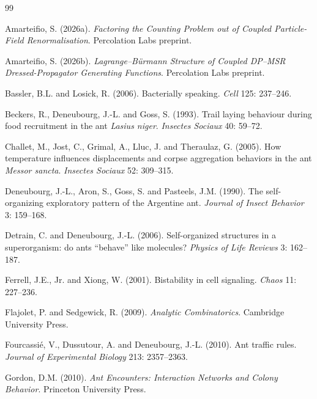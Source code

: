\documentclass[10pt,a4paper,twocolumn]{article}
\theoremstyle{definition}
\begin{document}
\begin{thebibliography}{99}

Amarteifio, S. (2026a).
\emph{Factoring the Counting Problem out of Coupled Particle-Field
Renormalisation}. Percolation Labs preprint.

Amarteifio, S. (2026b).
\emph{Lagrange--B\"urmann Structure of Coupled DP--MSR
Dressed-Propagator Generating Functions}. Percolation Labs preprint.

Bassler, B.L. and Losick, R. (2006). Bacterially speaking.
\emph{Cell} 125: 237--246.

Beckers, R., Deneubourg, J.-L. and Goss, S. (1993). Trail laying
behaviour during food recruitment in the ant \emph{Lasius niger}.
\emph{Insectes Sociaux} 40: 59--72.

Challet, M., Jost, C., Grimal, A., Lluc, J. and Theraulaz, G.
(2005). How temperature influences displacements and corpse
aggregation behaviors in the ant \emph{Messor sancta}.
\emph{Insectes Sociaux} 52: 309--315.

Deneubourg, J.-L., Aron, S., Goss, S. and Pasteels, J.M. (1990).
The self-organizing exploratory pattern of the Argentine ant.
\emph{Journal of Insect Behavior} 3: 159--168.

Detrain, C. and Deneubourg, J.-L. (2006). Self-organized
structures in a superorganism: do ants ``behave'' like molecules?
\emph{Physics of Life Reviews} 3: 162--187.

Ferrell, J.E., Jr. and Xiong, W. (2001). Bistability in cell
signaling. \emph{Chaos} 11: 227--236.

Flajolet, P. and Sedgewick, R. (2009).
\emph{Analytic Combinatorics}. Cambridge University Press.

Fourcassié, V., Dussutour, A. and Deneubourg, J.-L. (2010).
Ant traffic rules. \emph{Journal of Experimental Biology} 213:
2357--2363.

Gordon, D.M. (2010). \emph{Ant Encounters: Interaction Networks
and Colony Behavior}. Princeton University Press.


\end{thebibliography}
\end{document}
